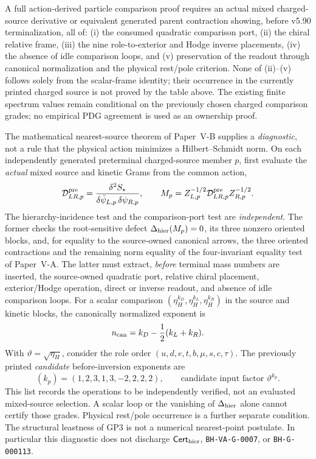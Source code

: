 \documentclass[11pt,a4paper]{article}
\begin{document}
\begin{corollary}
\label{p6:cor:v5124-owner-selection-open}
A full action-derived particle comparison proof requires an actual
mixed charged-source derivative or equivalent generated parent
contraction showing, before v5.90 terminalization, all of:
(i) the consumed quadratic comparison port, (ii) the chiral relative
frame, (iii) the nine role-to-exterior and Hodge inverse placements,
(iv) the absence of idle comparison loops, and (v) preservation of the
readout through canonical normalization and the physical rest/pole
criterion.  None of (ii)--(v) follows solely from the scalar-frame
identity; their occurrence in the currently printed charged source
is not proved by the table above.  The existing finite spectrum values
remain conditional on the previously chosen charged comparison grades;
no empirical PDG agreement is used as an ownership proof.
\end{corollary}

\begin{remark}
\label{p6:rem:v3024-charged-source-port-diagnostic}
The mathematical nearest-source theorem of Paper~V-B supplies a
\emph{diagnostic}, not a rule that the physical action minimizes a
Hilbert--Schmidt norm.  On each independently generated
preterminal charged-source member \(p\), first evaluate the
\emph{actual} mixed source and kinetic Grams from the common action,
\[
 \mathcal D_{LR,p}^{\rm pre}
  =\frac{\delta^2S_\star}
  {\delta\bar\psi_{L,p}\,\delta\psi_{R,p}},\qquad
 M_p=Z_{L,p}^{-1/2}\mathcal D_{LR,p}^{\rm pre}Z_{R,p}^{-1/2}.
\]
The hierarchy-incidence test and the comparison-port test are
\emph{independent}.  The former checks the root-sensitive defect
\(\Delta_{\rm hier}(M_p)=0\), its three nonzero oriented blocks,
and, for equality to the source-owned canonical arrows, the three
oriented contractions and the remaining norm equality of
the four-invariant equality test of Paper~V-A.
The latter must extract, \emph{before} terminal mass numbers are
inserted, the source-owned quadratic port, relative chiral placement,
exterior/Hodge operation, direct or inverse readout, and absence of
idle comparison loops.  For a scalar comparison
\((\eta_H^{k_D},\eta_H^{k_L},\eta_H^{k_R})\) in the source and
kinetic blocks, the canonically normalized exponent is
\[
  n_{\rm can}=k_D-\frac12(k_L+k_R).
\]
With \(\vartheta=\sqrt{\eta_H}\), consider the role order
\((u,d,e,t,b,\mu,s,c,\tau)\).
The previously printed \emph{candidate} before-inversion exponents are
\[
  (k_p)=(1,2,3,1,3,-2,2,2,2),\qquad
  \text{candidate input factor }\vartheta^{k_p}.
\]
This list records the operations to be independently verified, not
an evaluated mixed-source selection.  A scalar loop or the vanishing
of \(\Delta_{\rm hier}\) alone cannot certify those grades.
Physical rest/pole occurrence is a further separate condition.
The structural leastness of GP3 is not a numerical nearest-point
postulate.  In particular this diagnostic does not discharge
\(\mathsf{Cert}_{\rm hier}\), \texttt{BH-VA-G-0007}, or
\texttt{BH-G-000113}.
\end{remark}
\end{document}

